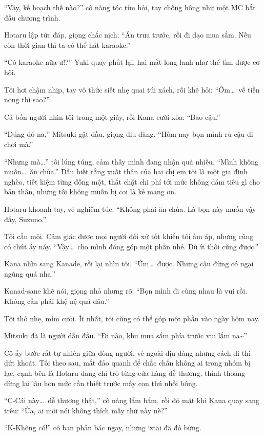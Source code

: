 \documentclass[../main.tex]{subfiles}
\begin{document}
``Vậy, kế hoạch thế nào?'' cô nàng tóc tím hỏi, tay chống hông như một MC bắt đầu chương trình.

Hotaru lập tức đáp, giọng chắc nịch: ``Ăn trưa trước, rồi đi dạo mua sắm. Nếu còn thời gian thì ta có thể hát karaoke.''

``Có karaoke nữa ư!?'' Yuki quay phắt lại, hai mắt long lanh như thể tìm được cơ hội.

Tôi hơi chậm nhịp, tay vô thức siết nhẹ quai túi xách, rồi khẽ hỏi: ``Ờm\dots\ về tiền nong thì sao?''

Cả bốn người nhìn tôi trong một giây, rồi Kana cười xòa: ``Bao cậu.''

``Đúng đó na,'' Mitsuki gật đầu, giọng dịu dàng. ``Hôm nay bọn mình rủ cậu đi chơi mà.''

``Nhưng mà\dots'' tôi lúng túng, cảm thấy mình đang nhận quá nhiều. ``Mình không muốn\dots\ ăn chùa.'' Dẫu biết rằng xuất thân của hai chị em tôi là một gia đình nghèo, tiết kiệm từng đồng một, thắt chặt chi phí tới mức không dám tiêu gì cho bản thân, nhưng tôi không muốn bị coi là kẻ mang ơn.

Hotaru khoanh tay, vẻ nghiêm túc. ``Không phải ăn chùa. Là bọn này muốn vậy đấy, Suzuno.''

Tôi cắn môi. Cảm giác được mọi người đối xử tốt khiến tôi ấm áp, nhưng cũng có chút áy náy. ``Vậy\dots\ cho mình đóng góp một phần nhé. Dù ít thôi cũng được.''

Kana nhìn sang Kanade, rồi lại nhìn tôi. ``Ừm\dots\ được. Nhưng cậu đừng có ngại ngùng quá nha.''

Kanad-sane khẽ nói, giọng nhỏ nhưng rõ: ``Bọn mình đi cùng nhau là vui rồi. Không cần phải khệ nệ quá đâu.''

Tôi thở nhẹ, mỉm cười. Ít nhất, tôi cũng có thể góp một phần vào ngày hôm nay.

Mitsuki đã là người dẫn đầu. ``Đi nào, khu mua sắm phía trước vui lắm na\~{}''

Cô ấy bước rất tự nhiên giữa dòng người, vẻ ngoài dịu dàng nhưng cách đi thì dứt khoát. Tôi theo sau, mắt đảo quanh để chắc chắn không ai trong nhóm bị lạc, cạnh bên là Hotaru đang chỉ trỏ từng cửa hàng dễ thương, thỉnh thoảng dừng lại lâu hơn mức cần thiết trước mấy con thú nhồi bông.

``C-Cái này\dots\ dễ thương thật,'' cô nàng lẩm bẩm, rồi đỏ mặt khi Kana quay sang trêu: ``Ủa, ai mới nói không thích mấy thứ này nè?''

``K-Không có!'' cô bạn phản bác ngay, nhưng `ztai đã đỏ bừng.
\end{document}
